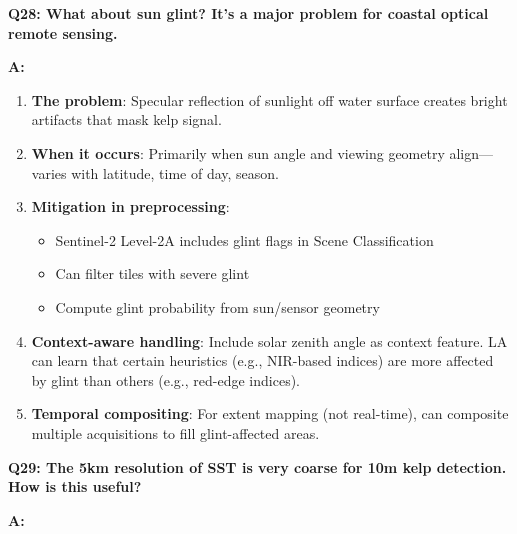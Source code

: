 \documentclass[11pt]{article}
\begin{document}
\textbf{Q28: What about sun glint? It's a major problem for coastal optical remote sensing.}

\textbf{A:}

\begin{enumerate}
    \item \textbf{The problem}: Specular reflection of sunlight off water surface creates bright artifacts that mask kelp signal.

    \item \textbf{When it occurs}: Primarily when sun angle and viewing geometry align---varies with latitude, time of day, season.

    \item \textbf{Mitigation in preprocessing}:
    \begin{itemize}
        \item Sentinel-2 Level-2A includes glint flags in Scene Classification
        \item Can filter tiles with severe glint
        \item Compute glint probability from sun/sensor geometry
    \end{itemize}

    \item \textbf{Context-aware handling}: Include solar zenith angle as context feature. LA can learn that certain heuristics (e.g., NIR-based indices) are more affected by glint than others (e.g., red-edge indices).

    \item \textbf{Temporal compositing}: For extent mapping (not real-time), can composite multiple acquisitions to fill glint-affected areas.
\end{enumerate}

\textbf{Q29: The 5km resolution of SST is very coarse for 10m kelp detection. How is this useful?}

\textbf{A:}
\end{document}
